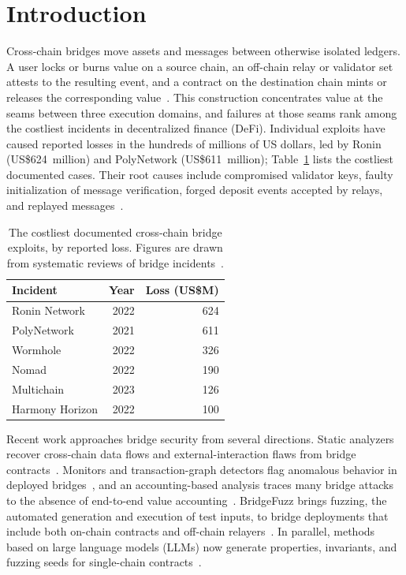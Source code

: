 \documentclass[a4paper]{cas-sc}
\newcommand{\hd}[1]{{\bfseries\boldmath #1}}
\begin{document}
\section{Introduction}\label{sec:intro}

Cross-chain bridges move assets and messages between otherwise isolated ledgers. A user locks or burns value on a source chain, an off-chain relay or validator set attests to the resulting event, and a contract on the destination chain mints or releases the corresponding value~\citep{belchior2021survey, augusto2024sok}. This construction concentrates value at the seams between three execution domains, and failures at those seams rank among the costliest incidents in decentralized finance (DeFi). Individual exploits have caused reported losses in the hundreds of millions of US dollars, led by Ronin (US\$624~million) and PolyNetwork (US\$611~million); Table~\ref{tab:losses} lists the costliest documented cases. Their root causes include compromised validator keys, faulty initialization of message verification, forged deposit events accepted by relays, and replayed messages~\citep{lee2023sok, duan2023attacks, liao2024smartaxe}.

\begin{table}[pos=htbp,belowcap=4pt]
\centering
\caption{The costliest documented cross-chain bridge exploits, by reported loss. Figures are drawn from systematic reviews of bridge incidents~\citep{lee2023sok, augusto2024sok, zhang2024bridgesok}.}
\label{tab:losses}
\footnotesize
\begin{tabular*}{\linewidth}{@{\extracolsep{\fill}}lrr@{}}
\toprule
\hd{Incident} & \hd{Year} & \hd{Loss (US\$M)} \\
\midrule
Ronin Network   & 2022 & 624 \\
PolyNetwork     & 2021 & 611 \\
Wormhole        & 2022 & 326 \\
Nomad           & 2022 & 190 \\
Multichain      & 2023 & 126 \\
Harmony Horizon & 2022 & 100 \\
\bottomrule
\end{tabular*}
\end{table}

Recent work approaches bridge security from several directions. Static analyzers recover cross-chain data flows and external-interaction flaws from bridge contracts~\citep{liao2024smartaxe, zhou2025bridgeguard}. Monitors and transaction-graph detectors flag anomalous behavior in deployed bridges~\citep{augusto2025xchainwatcher, wu2025safeguarding, lin2025connector}, and an accounting-based analysis traces many bridge attacks to the absence of end-to-end value accounting~\citep{liu2024montecrypto}. BridgeFuzz brings fuzzing, the automated generation and execution of test inputs, to bridge deployments that include both on-chain contracts and off-chain relayers~\citep{winkler2026bridgefuzz}. In parallel, methods based on large language models (LLMs) now generate properties, invariants, and fuzzing seeds for single-chain contracts~\citep{liu2025propertygpt, wang2024smartinv, gai2026llama}.
\end{document}
